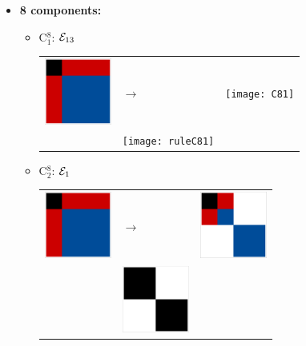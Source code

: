 \begin{itemize}
\item \textbf{8 components:} 
\begin{itemize}
\item C$_1^8$: $\mathcal{E}_{13}$\newline
\begin{tabular}{m{2cm} m{2cm} m{2cm}}
\includegraphics[width=2.2cm]{img-JA/id}  
& \hspace{0.8cm}$\longrightarrow$ 
& \texttt{[image: C81]} \\ 
 & \texttt{[image: ruleC81]} & 
\end{tabular} 

\item C$_2^8$: $\mathcal{E}_1$\newline
\begin{tabular}{m{2cm} m{2cm} m{2cm}}
\includegraphics[width=2.2cm]{img-JA/id}  
& \hspace{0.8cm}$\longrightarrow$ 
& \includegraphics[width=2.2cm]{img-JA/8comp}\\ 
 & \includegraphics[width=2.2cm]{img-JA/16To8} &  
\end{tabular} 
\end{itemize}


\end{itemize}
